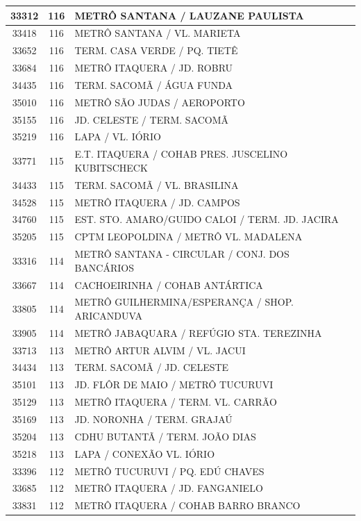 \documentclass[
	12pt,				%
	oneside,			%
	a4paper,			%
	english,			%
	brazil				%
	]{abntex2ppgsi}
\begin{document}
{{{\begin{apendicesenv}
\begin{longtable}{c|c|p{7cm}}
 \hline 
33312 &	116 &	METRÔ SANTANA / LAUZANE PAULISTA \\ 
 \hline 
33418 &	116 &	METRÔ SANTANA / VL. MARIETA \\ 
 \hline 
33652 &	116 &	TERM. CASA VERDE / PQ. TIETÊ \\ 
 \hline 
33684 &	116 &	METRÔ ITAQUERA / JD. ROBRU \\ 
 \hline 
34435 &	116 &	TERM. SACOMÃ / ÁGUA FUNDA \\ 
 \hline 
35010 &	116 &	METRÔ SÃO JUDAS / AEROPORTO \\ 
 \hline 
35155 &	116 &	JD. CELESTE / TERM. SACOMÃ \\ 
 \hline 
35219 &	116 &	LAPA / VL. IÓRIO \\ 
 \hline 
33771 &	115 &	E.T. ITAQUERA / COHAB PRES. JUSCELINO KUBITSCHECK \\ 
 \hline 
34433 &	115 &	TERM. SACOMÃ / VL. BRASILINA \\ 
 \hline 
34528 &	115 &	METRÔ ITAQUERA / JD. CAMPOS \\ 
 \hline 
34760 &	115 &	EST. STO. AMARO/GUIDO CALOI / TERM. JD. JACIRA \\ 
 \hline 
35205 &	115 &	CPTM LEOPOLDINA / METRÔ VL. MADALENA \\ 
 \hline 
33316 &	114 &	METRÔ SANTANA - CIRCULAR / CONJ. DOS BANCÁRIOS \\ 
 \hline 
33667 &	114 &	CACHOEIRINHA / COHAB ANTÁRTICA \\ 
 \hline 
33805 &	114 &	METRÔ GUILHERMINA/ESPERANÇA / SHOP. ARICANDUVA \\ 
 \hline 
33905 &	114 &	METRÔ JABAQUARA / REFÚGIO STA. TEREZINHA \\ 
 \hline 
33713 &	113 &	METRÔ ARTUR ALVIM / VL. JACUI \\ 
 \hline 
34434 &	113 &	TERM. SACOMÃ / JD. CELESTE \\ 
 \hline 
35101 &	113 &	JD. FLÔR DE MAIO / METRÔ TUCURUVI \\ 
 \hline 
35129 &	113 &	METRÔ ITAQUERA / TERM. VL. CARRÃO \\ 
 \hline 
35169 &	113 &	JD. NORONHA / TERM. GRAJAÚ \\ 
 \hline 
35204 &	113 &	CDHU BUTANTÃ / TERM. JOÃO DIAS \\ 
 \hline 
35218 &	113 &	LAPA / CONEXÃO VL. IÓRIO \\ 
 \hline 
33396 &	112 &	METRÔ TUCURUVI / PQ. EDÚ CHAVES \\ 
 \hline 
33685 &	112 &	METRÔ ITAQUERA / JD. FANGANIELO \\ 
 \hline 
33831 &	112 &	METRÔ ITAQUERA / COHAB BARRO BRANCO \\ 

\end{longtable}
\end{apendicesenv}}}}
\end{document}
